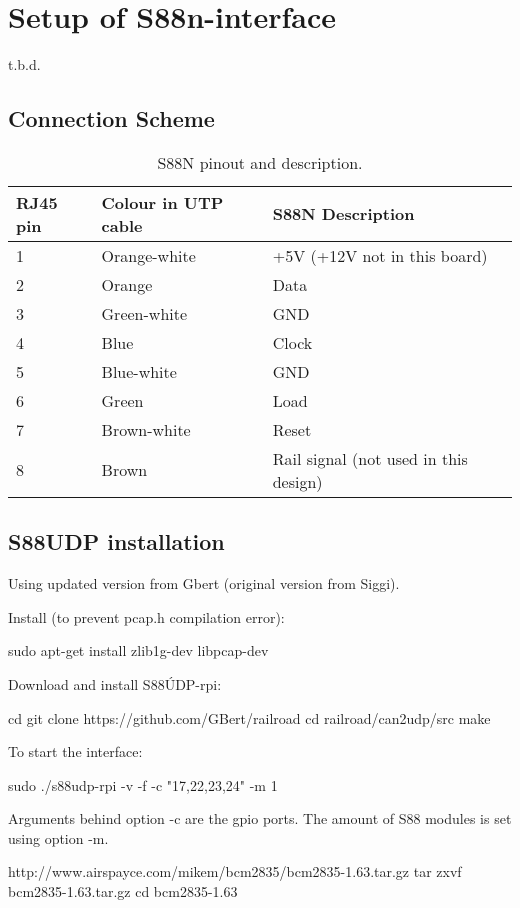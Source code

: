 \section{Setup of S88n-interface}
t.b.d.

\subsection{Connection Scheme}
	


\begin{table}[]
	\caption{S88N pinout and description.}
	\label{tab:my-table}
	\begin{tabular}{|l|l|l|}
		\hline
		\rowcolor[HTML]{9B9B9B} 
		\textbf{RJ45 pin} & \textbf{Colour in UTP cable} & \textbf{S88N Description}             \\ \hline
		1                 & Orange-white                 & +5V (+12V not in this board)          \\ \hline
		2                 & Orange                       & Data                                  \\ \hline
		3                 & Green-white                  & GND                                   \\ \hline
		4                 & Blue                         & Clock                                 \\ \hline
		5                 & Blue-white                   & GND                                   \\ \hline
		6                 & Green                        & Load                                  \\ \hline
		7                 & Brown-white                  & Reset                                 \\ \hline
		8                 & Brown                        & Rail signal (not used in this design) \\ \hline
	\end{tabular}
\end{table}

\subsection{S88UDP installation}
Using updated version from Gbert (original version from Siggi).


Install (to prevent pcap.h compilation error):

sudo apt-get install zlib1g-dev libpcap-dev

Download and install S88ÚDP-rpi:

cd
git clone https://github.com/GBert/railroad
cd railroad/can2udp/src
make

To start the interface: 

sudo ./s88udp-rpi -v -f -c "17,22,23,24" -m 1

Arguments behind option -c are the gpio ports. The amount of S88 modules is set using option -m.


http://www.airspayce.com/mikem/bcm2835/bcm2835-1.63.tar.gz 
tar zxvf bcm2835-1.63.tar.gz
cd bcm2835-1.63
